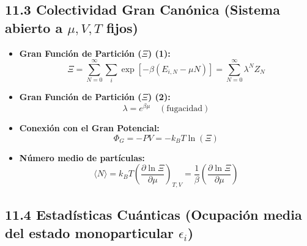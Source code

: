 \documentclass[11pt,a4paper]{article}
\begin{document}
\subsection*{11.3 Colectividad Gran Canónica (Sistema abierto a $\mu, V, T$ fijos)}

\begin{itemize}
  \item \textbf{Gran Función de Partición ($\Xi$) (1):}
  \[
    \Xi = \sum_{N=0}^\infty \sum_i \exp\left[ -\beta (E_{i,N} - \mu N) \right] = \sum_{N=0}^\infty \lambda^N Z_N
  \]
  \item \textbf{Gran Función de Partición ($\Xi$) (2):}
  \[
    \lambda = e^{\beta \mu} \quad (\text{fugacidad})
  \]
  \item \textbf{Conexión con el Gran Potencial:}
  \[
    \Phi_G = -P V = -k_B T \ln(\Xi)
  \]
  \item \textbf{Número medio de partículas:}
  \[
    \langle N \rangle = k_B T \left( \frac{\partial \ln \Xi}{\partial \mu} \right)_{T, V} = \frac{1}{\beta} \left( \frac{\partial \ln \Xi}{\partial \mu} \right)
  \]
\end{itemize}

\subsection*{11.4 Estadísticas Cuánticas (Ocupación media del estado monoparticular $\epsilon_i$)}
\end{document}
